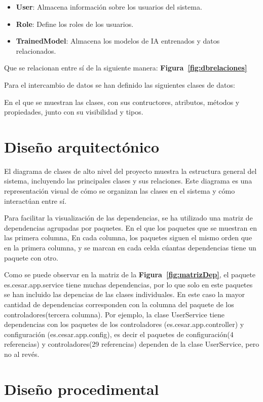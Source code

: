 \begin{itemize}
    \item \textbf{User}: Almacena información sobre los usuarios del sistema.
    \item \textbf{Role}: Define los roles de los usuarios.
    \item \textbf{TrainedModel}: Almacena los modelos de IA entrenados y datos relacionados.
\end{itemize}
Que se relacionan entre sí de la siguiente manera: \textbf{Figura~\ref{fig:dbrelaciones}}

Para el intercambio de datos se han definido las siguientes clases de datos:

En el que se muestran las clases, con sus contructores, atributos, métodos y propiedades, junto con su visibilidad y tipos.

\section{Diseño arquitectónico}

El diagrama de clases de alto nivel del proyecto muestra la estructura general del sistema, incluyendo las principales clases y sus relaciones. Este diagrama es una representación visual de cómo se organizan las clases en el sistema y cómo interactúan entre sí.

Para facilitar la visualización de las dependencias, se ha utilizado una matriz de dependencias agrupadas por paquetes. En el que los paquetes que se muestran en las primera columna, 
En cada columna, los paquetes siguen el mismo orden que en la primera columna, y se marcan en cada celda cúantas dependencias tiene un paquete con otro.

Como se puede observar en la matriz de la \textbf{Figura~\ref{fig:matrizDep}}, el paquete es.cesar.app.service tiene muchas dependencias, por lo que solo en este paquetes se han incluido las depencias de las clases individuales. En este caso la mayor cantidad de dependencias corresponden con la columna del paquete de los controladores(tercera columna). Por ejemplo, la clase UserService tiene dependencias con los paquetes de los controladores (es.cesar.app.controller) y configuración (es.cesar.app.config), es decir el paquetes de configuración(4 referencias) y controladores(29 referencias) dependen de la clase UserService, pero no al revés.

\section{Diseño procedimental}



